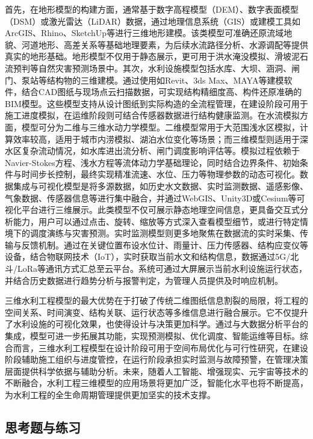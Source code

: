 首先，在地形模型的构建方面，通常基于数字高程模型（DEM）、数字表面模型（DSM）或激光雷达（LiDAR）数据，通过地理信息系统（GIS）或建模工具如ArcGIS、Rhino、SketchUp等进行三维地形建模。该类模型可准确还原流域地貌、河道地形、高差关系等基础地理要素，为后续水流路径分析、水源调配等提供真实的地形基础。地形模型不仅用于静态展示，更可用于洪水淹没模拟、滑坡泥石流预判等自然灾害预测场景中。其次，水利设施模型包括水库、大坝、涵洞、闸门、泵站等结构物的三维建模。通过使用如Revit、3ds Max、MAYA等建模软件，结合CAD图纸与现场点云扫描数据，可实现结构精细度高、构件还原准确的BIM模型。这些模型支持从设计图纸到实际构造的全流程管理，在建设阶段可用于施工进度模拟，在运维阶段则可结合传感器数据进行结构健康监测。在水流模拟方面，模型可分为二维与三维水动力学模型。二维模型常用于大范围浅水区模拟，计算效率较高，适用于城市内涝模拟、湖泊水位变化等场景；而三维模型则适用于深水区复杂流动情况，如水库进出流分析、闸门调度影响评估等。模拟过程依赖于Navier-Stokes方程、浅水方程等流体动力学基础理论，同时结合边界条件、初始条件与时间步长控制，最终实现精准流速、水位、压力等物理参数的动态可视化。数据集成与可视化模型是将多源数据，如历史水文数据、实时监测数据、遥感影像、气象数据、传感器信息等进行集中融合，并通过WebGIS、Unity3D或Cesium等可视化平台进行三维展示。此类模型不仅可展示静态地理空间信息，更具备交互式分析能力，用户可以通过点击、旋转、缩放等方式深入查看模型细节，或进行特定情境下的调度演练与灾害预测。实时监测模型则更多地聚焦在数据流的实时采集、传输与反馈机制。通过在关键位置布设水位计、雨量计、压力传感器、结构应变仪等设备，结合物联网技术（IoT），实时获取当前水文和结构信息，数据通过5G/北斗/LoRa等通讯方式汇总至云平台。系统可通过大屏展示当前水利设施运行状态，并结合历史数据进行趋势分析与报警判定，为管理人员提供及时响应机制。

三维水利工程模型的最大优势在于打破了传统二维图纸信息割裂的局限，将工程的空间关系、时间演变、结构关联、运行状态等多维信息进行融合展示。它不仅提升了水利设施的可视化效果，也使得设计与决策更加科学。通过与大数据分析平台的集成，模型可进一步拓展其功能，实现预测模拟、优化调度、智能运维等目标。综合而言，三维水利工程模型在设计阶段可用于空间布局优化与可行性研究，在建设阶段辅助施工组织与进度管控，在运行阶段承担实时监测与故障预警，在管理决策层面提供科学依据与辅助分析。未来，随着人工智能、增强现实、元宇宙等技术的不断融合，水利工程三维模型的应用场景将更加广泛，智能化水平也将不断提高，为水利工程的全生命周期管理提供更加坚实的技术支撑。

\subsection{思考题与练习}\label{ux601dux8003ux9898ux4e0eux7ec3ux4e60-4}

